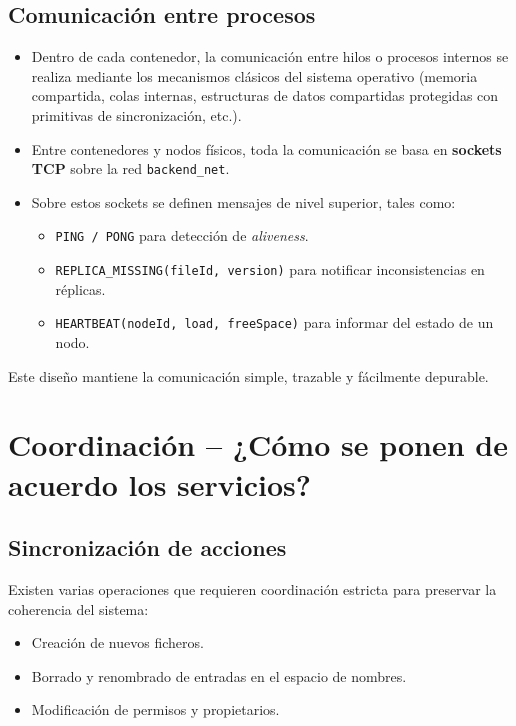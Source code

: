 \documentclass{article}
\begin{document}
\subsection{Comunicación entre procesos}
\begin{itemize}
    \item Dentro de cada contenedor, la comunicación entre hilos o procesos internos se realiza mediante los mecanismos clásicos del sistema operativo (memoria compartida, colas internas, estructuras de datos compartidas protegidas con primitivas de sincronización, etc.).
    \item Entre contenedores y nodos físicos, toda la comunicación se basa en \textbf{sockets TCP} sobre la red \texttt{backend\_net}.
    \item Sobre estos sockets se definen mensajes de nivel superior, tales como:
    \begin{itemize}
        \item \texttt{PING / PONG} para detección de \emph{aliveness}.
        \item \texttt{REPLICA\_MISSING(fileId, version)} para notificar inconsistencias en réplicas.
        \item \texttt{HEARTBEAT(nodeId, load, freeSpace)} para informar del estado de un nodo.
    \end{itemize}
\end{itemize}
Este diseño mantiene la comunicación simple, trazable y fácilmente depurable.

\section{Coordinación – ¿Cómo se ponen de acuerdo los servicios?}

\subsection{Sincronización de acciones}
Existen varias operaciones que requieren coordinación estricta para preservar la coherencia del sistema:
\begin{itemize}
    \item Creación de nuevos ficheros.
    \item Borrado y renombrado de entradas en el espacio de nombres.
    \item Modificación de permisos y propietarios.
\end{itemize}
\end{document}
